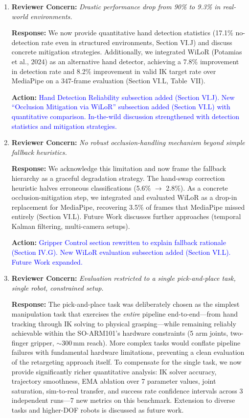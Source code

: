 \documentclass[11pt]{article}
\newcommand{\concern}[1]{\textbf{Reviewer Concern:} \textit{#1}}
\newcommand{\response}[1]{\textbf{Response:} #1}
\newcommand{\action}[1]{\textbf{Action:} \textcolor{blue}{#1}}
\begin{document}
\begin{enumerate}[label=\textbf{R1.\arabic*}]
\item \concern{Drastic performance drop from 90\% to 9.3\% in real-world environments.}

\response{We now provide quantitative hand detection statistics (17.1\% no-detection rate even in structured environments, Section VI.J) and discuss concrete mitigation strategies. Additionally, we integrated WiLoR (Potamias et al., 2024) as an alternative hand detector, achieving a 7.8\% improvement in detection rate and 8.2\% improvement in valid IK target rate over MediaPipe on a 347-frame evaluation (Section VI.L, Table~VII).}

\action{Hand Detection Reliability subsection added (Section VI.J). New ``Occlusion Mitigation via WiLoR'' subsection added (Section VI.L) with quantitative comparison. In-the-wild discussion strengthened with detection statistics and mitigation strategies.}

\item \concern{No robust occlusion-handling mechanism beyond simple fallback heuristics.}

\response{We acknowledge this limitation and now frame the fallback hierarchy as a graceful degradation strategy. The hand-swap correction heuristic halves erroneous classifications (5.6\% $\to$ 2.8\%). As a concrete occlusion-mitigation step, we integrated and evaluated WiLoR as a drop-in replacement for MediaPipe, recovering 3.5\% of frames that MediaPipe missed entirely (Section VI.L). Future Work discusses further approaches (temporal Kalman filtering, multi-camera setups).}

\action{Gripper Control section rewritten to explain fallback rationale (Section IV.G). New WiLoR evaluation subsection added (Section VI.L). Future Work expanded.}

\item \concern{Evaluation restricted to a single pick-and-place task, single robot, constrained setup.}

\response{The pick-and-place task was deliberately chosen as the simplest manipulation task that exercises the \emph{entire} pipeline end-to-end---from hand tracking through IK solving to physical grasping---while remaining reliably achievable within the SO-ARM101's hardware constraints (5 arm joints, two-finger gripper, $\sim$300\,mm reach). More complex tasks would conflate pipeline failures with fundamental hardware limitations, preventing a clean evaluation of the retargeting approach itself. To compensate for the single task, we now provide significantly richer quantitative analysis: IK solver accuracy, trajectory smoothness, EMA ablation over 7 parameter values, joint saturation, sim-to-real transfer, and success rate confidence intervals across 3 independent runs---7 new metrics on this benchmark. Extension to diverse tasks and higher-DOF robots is discussed as future work.}


\end{enumerate}
\end{document}
